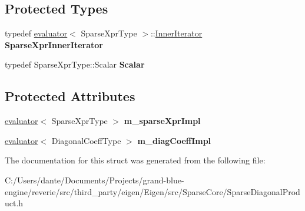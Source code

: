 \subsection*{Protected Types}
\begin{DoxyCompactItemize}
\item 
\mbox{\label{struct_eigen_1_1internal_1_1sparse__diagonal__product__evaluator_3_01_sparse_xpr_type_00_01_diag3ebd66799ce02a814119c716700b9642_ae0f1d996fb41d91c49c8fbcfd1df8236}} 
typedef \mbox{\hyperlink{struct_eigen_1_1internal_1_1evaluator}{evaluator}}$<$ Sparse\+Xpr\+Type $>$\+::\mbox{\hyperlink{class_eigen_1_1_inner_iterator}{Inner\+Iterator}} {\bfseries Sparse\+Xpr\+Inner\+Iterator}
\item 
\mbox{\label{struct_eigen_1_1internal_1_1sparse__diagonal__product__evaluator_3_01_sparse_xpr_type_00_01_diag3ebd66799ce02a814119c716700b9642_aaf521647b734d8c54814eb42a5bf4061}} 
typedef Sparse\+Xpr\+Type\+::\+Scalar {\bfseries Scalar}
\end{DoxyCompactItemize}
\subsection*{Protected Attributes}
\begin{DoxyCompactItemize}
\item 
\mbox{\label{struct_eigen_1_1internal_1_1sparse__diagonal__product__evaluator_3_01_sparse_xpr_type_00_01_diag3ebd66799ce02a814119c716700b9642_a2f20b5b97ca2947e6210f7db73aa3df9}} 
\mbox{\hyperlink{struct_eigen_1_1internal_1_1evaluator}{evaluator}}$<$ Sparse\+Xpr\+Type $>$ {\bfseries m\+\_\+sparse\+Xpr\+Impl}
\item 
\mbox{\label{struct_eigen_1_1internal_1_1sparse__diagonal__product__evaluator_3_01_sparse_xpr_type_00_01_diag3ebd66799ce02a814119c716700b9642_ac342ae760dab741c725386b65f530a73}} 
\mbox{\hyperlink{struct_eigen_1_1internal_1_1evaluator}{evaluator}}$<$ Diagonal\+Coeff\+Type $>$ {\bfseries m\+\_\+diag\+Coeff\+Impl}
\end{DoxyCompactItemize}


The documentation for this struct was generated from the following file\+:\begin{DoxyCompactItemize}
\item 
C\+:/\+Users/dante/\+Documents/\+Projects/grand-\/blue-\/engine/reverie/src/third\+\_\+party/eigen/\+Eigen/src/\+Sparse\+Core/Sparse\+Diagonal\+Product.\+h\end{DoxyCompactItemize}
